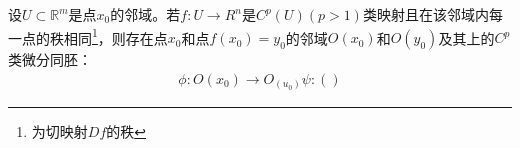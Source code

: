 
\begin{theorem}{}
设$U\subset \mathbb R^m$是点$x_0$的邻域。若$f:U\rightarrow R^n$是$ C^p(U)(p>1)$类映射且在该邻域内每一点的秩相同\footnote{为切映射$Df$的秩}，则存在点$x_0$和点$f(x_0)=y_0$的邻域$O(x_0)$和$O(y_0)$及其上的$C^p$类微分同胚：
\begin{equation}
\begin{aligned}
\phi:O(x_0) \rightarrow O_(u_0)
\psi:()
\end{aligned}
\end{equation}

\end{theorem}
